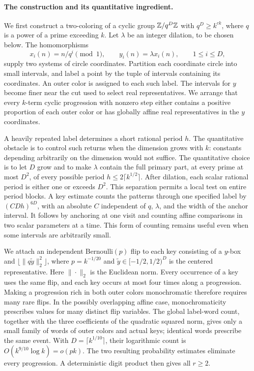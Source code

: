 \paragraph{The construction and its quantitative ingredient.}
We first construct a two-coloring of a cyclic group $\mathbb Z/q^D\mathbb Z$ with
$q^D\ge k^{ck}$, where $q$ is a power of a prime exceeding $k$.
Let $\lambda$ be an integer dilation, to be chosen below.
The homomorphisms
\[
 x_i(n)=n/q^i\pmod1,\qquad y_i(n)=\lambda x_i(n),
 \qquad 1\le i\le D,
\]
supply two systems of circle coordinates.
Partition each coordinate circle into small intervals, and label a point
by the tuple of intervals containing its coordinates.
An outer color is assigned to each such label.
The intervals for $y$ become finer near the cut used to select real
representatives.
We arrange that every $k$-term cyclic progression with nonzero step
either contains a positive proportion of each outer color or has
globally affine real representatives in the $y$ coordinates.

A heavily repeated label determines a short rational period $h$.
The quantitative obstacle is to control such returns when the dimension
grows with $k$: constants depending arbitrarily on the dimension would
not suffice.
The quantitative choice is to let $D$ grow and to make $\lambda$
contain the full primary part, at every prime at most $D^2$, of
every possible period $h\le2\lceil k^{1/2}\rceil$.
After dilation, each scalar rational period is either one or exceeds
$D^2$.
This separation permits a local test on entire period blocks.
A key estimate counts the patterns through one specified label by
$(CDh)^{6D}$, with an absolute $C$ independent of $q$, $\lambda$,
and the width of the anchor interval.
It follows by anchoring at one visit and counting affine comparisons
in two scalar parameters at a time.
This form of counting remains useful even when some intervals are
arbitrarily small.

We attach an independent Bernoulli$(p)$ flip to each key consisting
of a $y$-box and $\lfloor\|q\widetilde y\|_2^2\rfloor$, where
$p=k^{-1/20}$ and $\widetilde y\in[-1/2,1/2)^D$ is the centered
representative. Here $\|\cdot\|_2$ is the Euclidean norm.
Every occurrence of a key uses the same flip, and each key occurs
at most four times along a progression.
Making a progression rich in both outer colors monochromatic
therefore requires many rare flips.
In the possibly overlapping affine case, monochromaticity prescribes
values for many distinct flip variables. The global label-word count,
together with the three coefficients of the quadratic squared norm,
gives only a small family of words of outer colors and actual keys;
identical words prescribe the same event.
With $D=\lceil k^{1/10}\rceil$, their logarithmic count is
$O(k^{9/10}\log k)=o(pk)$.
The two resulting probability estimates eliminate every progression.
A deterministic digit product then gives all $r\ge2$.

